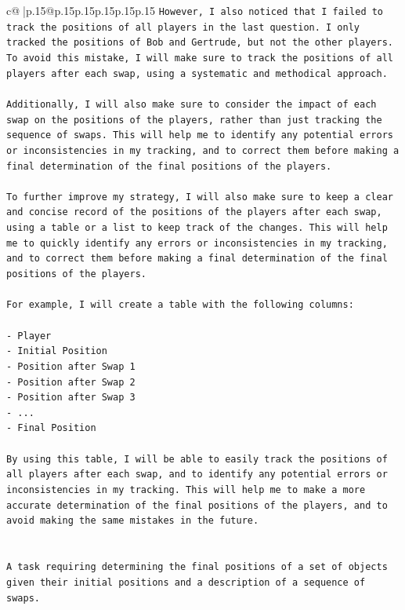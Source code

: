 \documentclass{article}
\begin{document}
{\begin{supertabular}{c@{$\;$}|p{.15\linewidth}@{}p{.15\linewidth}p{.15\linewidth}p{.15\linewidth}p{.15\linewidth}p{.15\linewidth}}
{{{\texttt{However, I also noticed that I failed to track the positions of all players in the last question. I only tracked the positions of Bob and Gertrude, but not the other players. To avoid this mistake, I will make sure to track the positions of all players after each swap, using a systematic and methodical approach. } \\
\\ 
\texttt{Additionally, I will also make sure to consider the impact of each swap on the positions of the players, rather than just tracking the sequence of swaps. This will help me to identify any potential errors or inconsistencies in my tracking, and to correct them before making a final determination of the final positions of the players.} \\
\\ 
\texttt{To further improve my strategy, I will also make sure to keep a clear and concise record of the positions of the players after each swap, using a table or a list to keep track of the changes. This will help me to quickly identify any errors or inconsistencies in my tracking, and to correct them before making a final determination of the final positions of the players.} \\
\\ 
\texttt{For example, I will create a table with the following columns:} \\
\\ 
\texttt{{-} Player} \\
\texttt{{-} Initial Position} \\
\texttt{{-} Position after Swap 1} \\
\texttt{{-} Position after Swap 2} \\
\texttt{{-} Position after Swap 3} \\
\texttt{{-} ...} \\
\texttt{{-} Final Position} \\
\\ 
\texttt{By using this table, I will be able to easily track the positions of all players after each swap, and to identify any potential errors or inconsistencies in my tracking. This will help me to make a more accurate determination of the final positions of the players, and to avoid making the same mistakes in the future.} \\
\\ 
\\ 
\texttt{A task requiring determining the final positions of a set of objects given their initial positions and a description of a sequence of swaps.} \\
}}}
\end{supertabular}}
\end{document}
